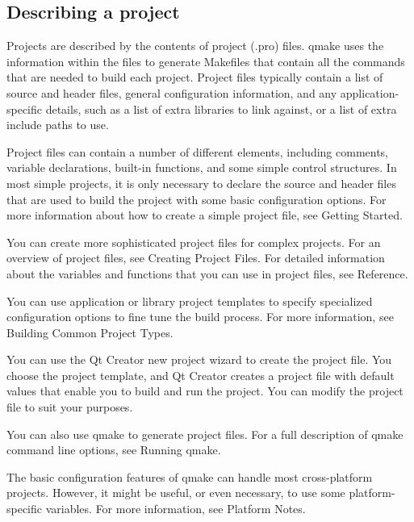 \subsection{Describing a project}
Projects are described by the contents of project (.pro) files. qmake uses the information within the files to generate Makefiles that contain all the commands that are needed to build each project. Project files typically contain a list of source and header files, general configuration information,
and any application-specific details, such as a list of extra libraries to link against, or a list of extra include paths to use.
\par
Project files can contain a number of different elements, including comments, variable declarations, built-in functions, and some simple control structures. In most simple projects, it is only necessary to declare the source and header files that are used to build the project with some basic
configuration options. For more information about how to create a simple project file, see Getting Started.
\par
You can create more sophisticated project files for complex projects. For an overview of project files, see Creating Project Files. For detailed information about the variables and functions that you can use in project files, see Reference.
\par
You can use application or library project templates to specify specialized configuration options to fine tune the build process. For more information, see Building Common Project Types.
\par
You can use the Qt Creator new project wizard to create the project file. You choose the project template, and Qt Creator creates a project file with default values that enable you to build and run the project. You can modify the project file to suit your purposes.
\par
You can also use qmake to generate project files. For a full description of qmake command line options, see Running qmake.
\par
The basic configuration features of qmake can handle most cross-platform projects. However, it might be useful, or even necessary, to use some platform-specific variables. For more information, see Platform Notes.

